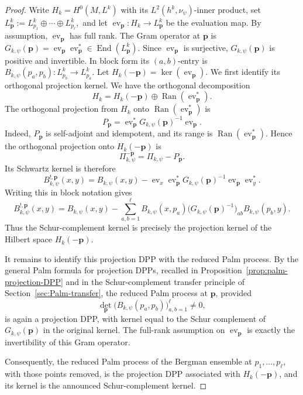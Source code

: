 \documentclass[12pt,a4paper,reqno]{article}
\theoremstyle{thmstyleone}
\theoremstyle{thmstylethree}
\theoremstyle{thmstyletwo}
\numberwithin{equation}{subsection}
\begin{document}
\begin{proof}
Write $H_k=H^0(M,L^k)$ with its $L^2(h^k,\nu_\psi)$-inner product, set $L^k_{\mathbf p}:=L^k_{p_1}\oplus\cdots\oplus L^k_{p_\ell},$ and let $\operatorname{ev}_{\mathbf p}:H_k\longrightarrow L^k_{\mathbf p}$ be the evaluation map. By assumption, $\operatorname{ev}_{\mathbf p}$ has full rank. The Gram operator at $\mathbf p$ is $G_{k,\psi}(\mathbf p)=\operatorname{ev}_{\mathbf p}\operatorname{ev}_{\mathbf p}^{*}\in \operatorname{End}(L^k_{\mathbf p}).$ Since $\operatorname{ev}_{\mathbf p}$ is surjective, $G_{k,\psi}(\mathbf p)$ is positive and invertible. In block form its $(a,b)$-entry is $B_{k,\psi}(p_a,p_b):L^k_{p_b}\longrightarrow L^k_{p_a}.$ Let $H_k(-\mathbf p)=\ker(\operatorname{ev}_{\mathbf p}).$ We first identify its orthogonal projection kernel. We have the orthogonal decomposition
\[
H_k=H_k(-\mathbf p)\oplus \operatorname{Ran}(\operatorname{ev}_{\mathbf p}^{*}).
\]
The orthogonal projection from $H_k$ onto
$\operatorname{Ran}(\operatorname{ev}_{\mathbf p}^{*})$ is
\[
P_{\mathbf p}
=
\operatorname{ev}_{\mathbf p}^{*}
G_{k,\psi}(\mathbf p)^{-1}
\operatorname{ev}_{\mathbf p}.
\]
Indeed, $P_{\mathbf p}$ is self-adjoint and idempotent, and its range is $\operatorname{Ran}(\operatorname{ev}_{\mathbf p}^{*})$. Hence the orthogonal projection onto $H_k(-\mathbf p)$ is
\[
\Pi_{k,\psi}^{-\mathbf p}
=
\Pi_{k,\psi}-P_{\mathbf p}.
\]
Its Schwartz kernel is therefore
\[
B_{k,\psi}^{!,\mathbf p}(x,y)
=
B_{k,\psi}(x,y)
-
\operatorname{ev}_{x}\operatorname{ev}_{\mathbf p}^{*}
G_{k,\psi}(\mathbf p)^{-1}
\operatorname{ev}_{\mathbf p}\operatorname{ev}_{y}^{*}.
\]
Writing this in block notation gives
\[
B_{k,\psi}^{!,\mathbf p}(x,y)
=
B_{k,\psi}(x,y)
-
\sum_{a,b=1}^{\ell}
B_{k,\psi}(x,p_a)
\bigl(G_{k,\psi}(\mathbf p)^{-1}\bigr)_{ab}
B_{k,\psi}(p_b,y).
\]
Thus the Schur-complement kernel is precisely the projection kernel of the Hilbert space $H_k(-\mathbf p)$.

It remains to identify this projection DPP with the reduced Palm process. By the general Palm formula for projection DPPs, recalled in Proposition~\ref{prop:palm-projection-DPP} and in the Schur-complement transfer principle of Section~\ref{sec:Palm-transfer}, the reduced Palm process at $\mathbf p$, provided
\[
\det_{\mathbf p}\bigl(B_{k,\psi}(p_a,p_b)\bigr)_{a,b=1}^{\ell}\neq0,
\]
is again a projection DPP, with kernel equal to the Schur complement of $G_{k,\psi}(\mathbf p)$ in the original kernel. The full-rank assumption on $\operatorname{ev}_{\mathbf p}$ is exactly the invertibility of this Gram operator.

Consequently, the reduced Palm process of the Bergman ensemble at $p_1,\ldots,p_\ell$, with those points removed, is the projection DPP associated with $H_k(-\mathbf p)$, and its kernel is the announced Schur-complement kernel.
\end{proof}
\end{document}
